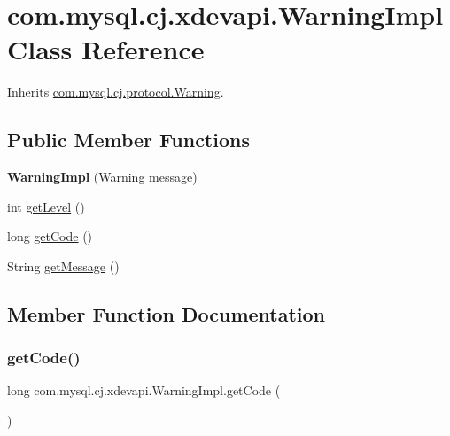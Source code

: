 \hypertarget{classcom_1_1mysql_1_1cj_1_1xdevapi_1_1_warning_impl}{}\section{com.\+mysql.\+cj.\+xdevapi.\+Warning\+Impl Class Reference}
\label{classcom_1_1mysql_1_1cj_1_1xdevapi_1_1_warning_impl}


Inherits \mbox{\hyperlink{interfacecom_1_1mysql_1_1cj_1_1protocol_1_1_warning}{com.\+mysql.\+cj.\+protocol.\+Warning}}.

\subsection*{Public Member Functions}
\begin{DoxyCompactItemize}
\item 
\mbox{\label{classcom_1_1mysql_1_1cj_1_1xdevapi_1_1_warning_impl_ab29b3bf7a858f1b4f6f0a5b1acb4ca8a}} 
{\bfseries Warning\+Impl} (\mbox{\hyperlink{interfacecom_1_1mysql_1_1cj_1_1protocol_1_1_warning}{Warning}} message)
\item 
int \mbox{\hyperlink{classcom_1_1mysql_1_1cj_1_1xdevapi_1_1_warning_impl_abc0fcf3e60763b3d3ce1b7126be22f61}{get\+Level}} ()
\item 
long \mbox{\hyperlink{classcom_1_1mysql_1_1cj_1_1xdevapi_1_1_warning_impl_a4e36aba92d49db5855897c8a26ffce06}{get\+Code}} ()
\item 
String \mbox{\hyperlink{classcom_1_1mysql_1_1cj_1_1xdevapi_1_1_warning_impl_afeeda25bc13726f35b4198262c46f605}{get\+Message}} ()
\end{DoxyCompactItemize}


\subsection{Member Function Documentation}
\mbox{\label{classcom_1_1mysql_1_1cj_1_1xdevapi_1_1_warning_impl_a4e36aba92d49db5855897c8a26ffce06}} 
\subsubsection{\texorpdfstring{get\+Code()}{getCode()}}
{\footnotesize\ttfamily long com.\+mysql.\+cj.\+xdevapi.\+Warning\+Impl.\+get\+Code (\begin{DoxyParamCaption}{ }\end{DoxyParamCaption})}

